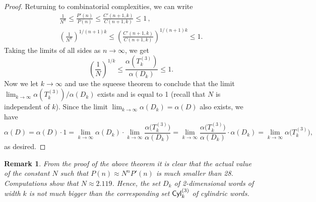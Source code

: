 \documentclass[submission,copyright]{eptcs}\providecommand{\event}{WORDS 2011}
\newtheorem {Rmk} {Remark}
\def\Cyl{{\sf Cyl}}
\begin{document}
\begin{proof}
Returning to combinatorial complexities, we can write
\begin{gather*}
\frac{1}{N^n}\leq \frac{P'(n)}{P(n)}\leq \frac{C'(n{+}1,k)}{C(n{+}1,k)}\leq 1\,,\\\left({\frac{1}{N^n}}\right)^{1/(n{+}1)k}\leq \left({\frac{C'(n{+}1,k)}{C(n{+}1,k)}}\right)^{1/(n{+}1)k}\leq 1.
\end{gather*}
Taking the limits of all sides as $n\rightarrow \infty$, we get
$$
\left({\frac{1}{N}}\right)^{1/k}\leq {\frac{\alpha(T_k^{(3)})}{\alpha(D_k)}}\leq 1.
$$
Now we let $k\rightarrow \infty$ and use the squeese theorem to conclude that the limit $\lim_{k\to\infty}{\alpha(T_k^{(3)})/\alpha(D_k)}$ exists and is equal to 1 (recall that $N$ is independent of $k$). Since the limit $\lim_{k\to\infty}\alpha(D_k)=\alpha (D)$ also exists, we have
$$
\alpha(D)=\alpha(D)\cdot1=\lim_{k\to\infty}\alpha(D_k){\cdot}\lim_{k\to\infty}{\frac{\alpha\big(T_k^{(3)}\big)}{\alpha(D_k)}}= \lim_{k\to\infty}{\frac{\alpha\big(T_k^{(3)}\big)}{\alpha(D_k)}}\cdot\alpha(D_k)=\lim_{k\to\infty}{\alpha\big(T_k^{(3)}\big)},
$$
as desired.
\end{proof}

\begin{Rmk}
From the proof of the above theorem it is clear that the actual value of the constant $N$ such that $P(n)\approx N^nP'(n)$ is much smaller than 28. Computations show that $N\approx 2.119$. Hence, the set $D_k$ of 2-dimensional words of width $k$ is not much bigger than the corresponding set $\Cyl_k^{(3)}$ of cylindric words.
\end{Rmk}
\end{document}
